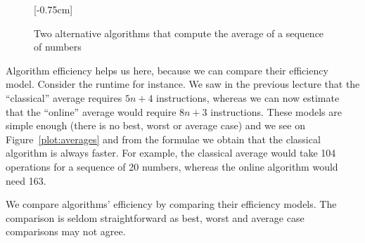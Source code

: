 \documentclass{aldast}
\begin{document}
\begin{figure}[htbp]
  [-0.75cm]
  \centering
  \caption{Two alternative algorithms that compute the average of a
    sequence of numbers}
  \label{alg:averages}
\end{figure}

Algorithm efficiency helps us here, because we can compare their
efficiency model. Consider the runtime for instance. We saw in the
previous lecture that the ``classical'' average requires $5n+4$
instructions, whereas we can now estimate that the ``online'' average
would require $8n + 3$ instructions. These models are simple enough
(there is no best, worst or average case) and we see on
Figure~\ref{plot:averages} and from the formulae we obtain that the
classical algorithm is always faster. For example, the classical
average would take 104 operations for a sequence of 20 numbers,
whereas the online algorithm would need 163.

\begin{takeaway}
  We compare algorithms' efficiency by comparing their efficiency
  models. The comparison is seldom straightforward as best, worst and
  average case comparisons may not agree.
\end{takeaway}
\end{document}
